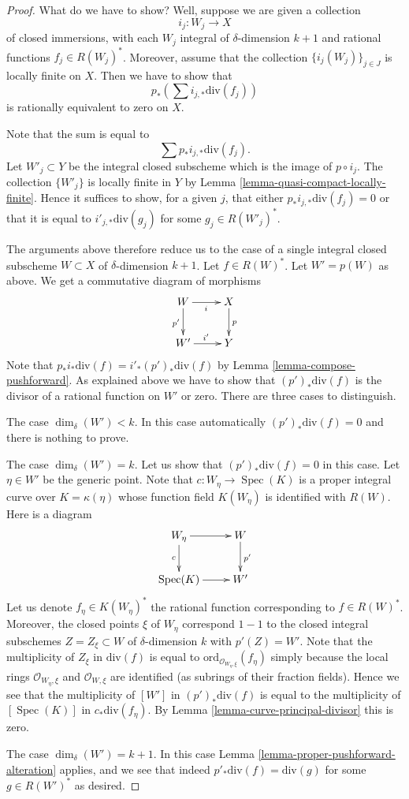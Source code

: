 \documentclass[10pt,a4paper]{amsart}
\theoremstyle{plain}
\theoremstyle{definition}
\theoremstyle{remark}
\numberwithin{equation}{subsection}
\def\Spec{\mathop{\mathrm{Spec}}}
\begin{document}
\begin{proof}
What do we have to show? Well, suppose we are given a collection
$$
i_j : W_j \longrightarrow X
$$
of closed immersions, with each $W_j$ integral of $\delta$-dimension $k + 1$
and rational functions $f_j \in R(W_j)^*$.
Moreover, assume that
the collection $\{i_j(W_j)\}_{j \in J}$ is locally finite on $X$.
Then we have to show that
$$
p_*\left(\sum i_{j, *}\text{div}(f_j)\right)
$$
is rationally equivalent to zero on $X$.

\medskip\noindent
Note that the sum is equal to
$$
\sum p_*i_{j, *}\text{div}(f_j).
$$
Let $W'_j \subset Y$ be the integral closed subscheme which is the
image of $p \circ i_j$. The collection $\{W'_j\}$ is locally finite
in $Y$ by Lemma \ref{lemma-quasi-compact-locally-finite}.
Hence it suffices to show, for a given $j$, that either
$p_*i_{j, *}\text{div}(f_j) = 0$ or that it
is equal to $i'_{j, *}\text{div}(g_j)$ for some $g_j \in R(W'_j)^*$.

\medskip\noindent
The arguments above therefore reduce us to the case of a single
integral closed subscheme $W \subset X$ of $\delta$-dimension $k + 1$.
Let $f \in R(W)^*$. Let $W' = p(W)$ as above.
We get a commutative diagram of morphisms
$$
\xymatrix{
W \ar[r]_i \ar[d]_{p'} & X \ar[d]^p \\
W' \ar[r]^{i'} & Y
}
$$
Note that $p_*i_*\text{div}(f) = i'_*(p')_*\text{div}(f)$ by
Lemma \ref{lemma-compose-pushforward}. As explained above
we have to show that $(p')_*\text{div}(f)$
is the divisor of a rational function on $W'$ or zero.
There are three cases to distinguish.

\medskip\noindent
The case $\dim_\delta(W') < k$. In this case automatically
$(p')_*\text{div}(f) = 0$ and there is nothing to prove.

\medskip\noindent
The case $\dim_\delta(W') = k$. Let us show that $(p')_*\text{div}(f) = 0$
in this case. Let $\eta \in W'$ be the generic point.
Note that $c : W_\eta \to \Spec(K)$
is a proper integral curve over $K = \kappa(\eta)$
whose function field $K(W_\eta)$ is identified with $R(W)$.
Here is a diagram
$$
\xymatrix{
W_\eta \ar[r] \ar[d]_c & W \ar[d]^{p'} \\
\Spec(K) \ar[r] & W'
}
$$
Let us denote $f_\eta \in K(W_\eta)^*$ the rational function
corresponding to $f \in R(W)^*$.
Moreover, the closed points $\xi$ of $W_\eta$ correspond $1 - 1$ to the
closed integral subschemes $Z = Z_\xi \subset W$ of $\delta$-dimension $k$
with $p'(Z) = W'$. Note that the multiplicity
of $Z_\xi$ in $\text{div}(f)$ is equal to
$\text{ord}_{\mathcal{O}_{W_\eta, \xi}}(f_\eta)$ simply because the
local rings $\mathcal{O}_{W_\eta, \xi}$ and $\mathcal{O}_{W, \xi}$
are identified (as subrings of their fraction fields).
Hence we see that the multiplicity of $[W']$ in
$(p')_*\text{div}(f)$ is equal to the multiplicity of
$[\Spec(K)]$ in $c_*\text{div}(f_\eta)$.
By Lemma \ref{lemma-curve-principal-divisor} this is zero.

\medskip\noindent
The case $\dim_\delta(W') = k + 1$. In this case
Lemma \ref{lemma-proper-pushforward-alteration} applies,
and we see that indeed $p'_*\text{div}(f) = \text{div}(g)$
for some $g \in R(W')^*$ as desired.
\end{proof}
\end{document}
